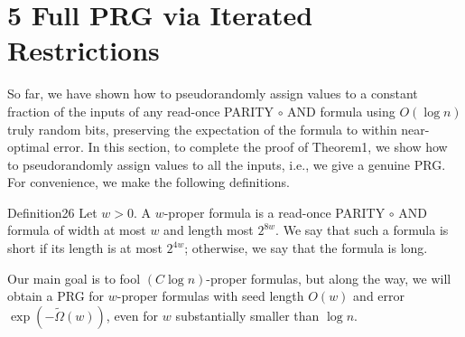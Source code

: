 \section*{5 Full PRG via Iterated Restrictions}
So far, we have shown how to pseudorandomly assign values to a constant fraction of the inputs of any read-once PARITY $\circ$ AND formula using $O(\log n)$ truly random bits, preserving the expectation of the formula to within near-optimal error. In this section, to complete the proof of Theorem1, we show how to pseudorandomly assign values to all the inputs, i.e., we give a genuine PRG.
For convenience, we make the following definitions.
\begin{authorclaim}{Definition26}
Let $w>0$. A $w$-proper formula is a read-once PARITY $\circ$ AND formula of width at most $w$ and length most $2^{8w}$. We say that such a formula is short if its length is at most $2^{4w}$; otherwise, we say that the formula is long.
\end{authorclaim}
Our main goal is to fool $(C\log n)$-proper formulas, but along the way, we will obtain a PRG for $w$-proper formulas with seed length $O(w)$ and error $\exp(-\widetilde\Omega(w))$, even for $w$ substantially smaller than $\log n$.
